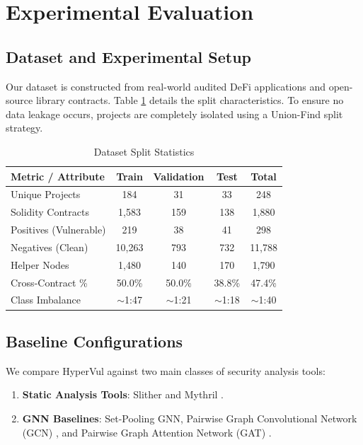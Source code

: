 \documentclass[conference]{IEEEtran}
\begin{document}
\section{Experimental Evaluation}

\subsection{Dataset and Experimental Setup}
Our dataset is constructed from real-world audited DeFi applications and open-source library contracts. Table \ref{tab:splits} details the split characteristics. To ensure no data leakage occurs, projects are completely isolated using a Union-Find split strategy.

\begin{table}[h]
\centering
\caption{Dataset Split Statistics}
\label{tab:splits}
\begin{tabular}{lcccc}
\toprule
\textbf{Metric / Attribute} & \textbf{Train} & \textbf{Validation} & \textbf{Test} & \textbf{Total} \\
\midrule
Unique Projects & 184 & 31 & 33 & 248 \\
Solidity Contracts & 1,583 & 159 & 138 & 1,880 \\
Positives (Vulnerable) & 219 & 38 & 41 & 298 \\
Negatives (Clean) & 10,263 & 793 & 732 & 11,788 \\
Helper Nodes & 1,480 & 140 & 170 & 1,790 \\
Cross-Contract \% & 50.0\% & 50.0\% & 38.8\% & 47.4\% \\
Class Imbalance & $\sim$1:47 & $\sim$1:21 & $\sim$1:18 & $\sim$1:40 \\
\bottomrule
\end{tabular}
\end{table}

\subsection{Baseline Configurations}
We compare HyperVul against two main classes of security analysis tools:
\begin{enumerate}
    \item \textbf{Static Analysis Tools}: Slither \cite{feist2019slither} and Mythril \cite{mythril}.
    \item \textbf{GNN Baselines}: Set-Pooling GNN, Pairwise Graph Convolutional Network (GCN) \cite{gcn}, and Pairwise Graph Attention Network (GAT) \cite{gat}.
\end{enumerate}
\end{document}
